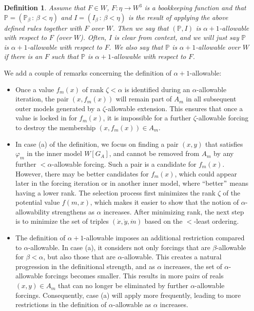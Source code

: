 \documentclass[a4paper,11pt]{article}
\newtheorem{definition}[theorem]{Definition}
\newcommand{\forceP}{\mathbb{P}}
\begin{document}
\begin{definition}
Assume that $F \in W$, $F: \eta \rightarrow W^3$ is a bookkeeping function and that $\forceP=(\forceP_{\beta} \, : \, \beta < \eta)$ and $I=(I_{\beta} \, : \, \beta < \eta)$ is the result of applying the above defined rules together with $F$ over $W$. Then we say that $(\forceP,I)$ is $\alpha+1$-allowable with respect to $F$ (over $W$). Often, $I$ is clear from context, and we will just say $\forceP$ is $\alpha+1$-allowable with respect to $F$. We also say that $\forceP$ is $\alpha+1$-allowable over $W$ if there is an $F$ such that $\forceP$ is $\alpha+1$-allowable with respect to $F$.
\end{definition}
We add a couple of remarks concerning the definition of $\alpha+1$-allowable:

\begin{itemize}

\item   Once a value \( f_m(x) \) of rank \( \zeta < \alpha \) is identified during an \( \alpha \)-allowable iteration, the pair \( (x, f_m(x)) \) will remain part of \( A_m \) in all subsequent outer models generated by a \( \zeta \)-allowable extension. This ensures that once a value is locked in for \( f_m(x) \), it is impossible for a further \( \zeta \)-allowable forcing to destroy the membership \( (x,f_m (x) ) \in A_m \).


\item In case (a) of the definition, we focus on finding a pair \( (x, y) \) that satisfies \( \varphi_m \) in the inner model \( W[G_A] \), and cannot be removed from \( A_m \) by any further \( < \alpha \)-allowable forcing. Such a pair is a candidate for \( f_m(x) \). However, there may be better candidates for \( f_m(x) \), which could appear later in the forcing iteration or in another inner model, where ``better$"$ means having a lower rank. The selection process first minimizes the rank \( \zeta \) of the potential value \( f(m,x) \), which makes it easier to show that the notion of \( \alpha \)-allowability strengthens as \( \alpha \) increases. After minimizing rank, the next step is to minimize the set of triples \( (\dot{x}, \dot{y}, \dot{m}) \) based on the \( < \)-least ordering.

\item  The definition of \( \alpha+1 \)-allowable imposes an additional restriction compared to \( \alpha \)-allowable. In case (a), it considers not only forcings that are \( \beta \)-allowable for \( \beta < \alpha \), but also those that are \( \alpha \)-allowable. This creates a natural progression in the definitional strength, and as \( \alpha \) increases, the set of \( \alpha \)-allowable forcings becomes smaller. This results in more pairs of reals \( (x, y) \in A_m \) that can no longer be eliminated by further \( \alpha \)-allowable forcings. Consequently, case (a) will apply more frequently, leading to more restrictions in the definition of \( \alpha \)-allowable as \( \alpha \) increases. 


\end{itemize}
\end{document}
